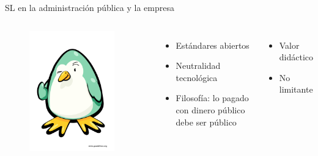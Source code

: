 \documentclass{beamer}
\begin{document}
\begin{frame}{SL en la administración pública y la empresa}
  \begin{columns}
    \begin{figure}
      \centering
      \includegraphics[width=0.9\textwidth]{pics/andatuz.png}
    \end{figure}

    \begin{itemize}
    \item Estándares abiertos
    \item Neutralidad tecnológica
    \item Filosofía: lo pagado con dinero público debe ser público
    \end{itemize}
    
    \pause

    \begin{itemize}
    \item Valor didáctico
    \item No limitante
    \end{itemize}


\end{columns}
\end{frame}
\end{document}
